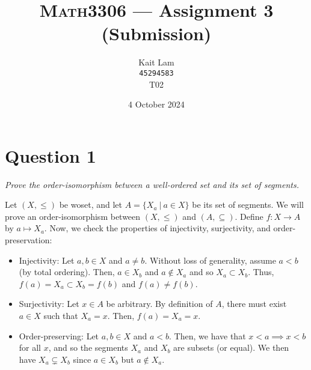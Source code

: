 \documentclass[a4paper]{article}
\author{Kait Lam \\ \small \texttt{45294583} \\ \small {T02}}
\title{\textsc{Math3306} --- Assignment 3 (Submission)}
\date{4 October 2024}
\begin{document}
\maketitle


\section*{Question 1}
\begin{center}
  \textit{Prove the order-isomorphism between a well-ordered set and its set of segments.}
\end{center}
Let $(X, \le)$ be woset, and let $A = \{X_a ~|~ a \in X\}$ be its set of segments.
We will prove an order-isomorphism between $(X, \le)$ and $(A, \subseteq)$.
Define $f : X \to A$ by $a \mapsto X_a$.
Now, we check the properties of injectivity, surjectivity, and order-preservation:
\begin{itemize}
  \item 
    Injectivity: Let $a, b \in X$ and $a \ne b$. Without loss of generality,
    assume $a < b$ (by total ordering).
    Then, $a \in X_b$ and $a \notin X_a$ and so $X_a \subset X_b$. 
    Thus,
    $f(a) = X_a \subset X_b = f(b)$ and $f(a) \ne f(b)$.

  \item Surjectivity:
    Let $x \in A$ be arbitrary. By definition of $A$, there must exist $a \in X$ such that $X_a = x$.
    Then, $f(a) = X_a = x$.

  \item Order-preserving:
    Let $a, b \in X$ and $a < b$.
    Then, we have that $x < a \implies x < b$ for all $x$,
    and so the segments $X_a$ and $X_b$ are subsets (or equal).
    We then have $X_a \subsetneq X_b$ since $a \in X_b$ but $a \notin X_a$.
\end{itemize}
\end{document}
